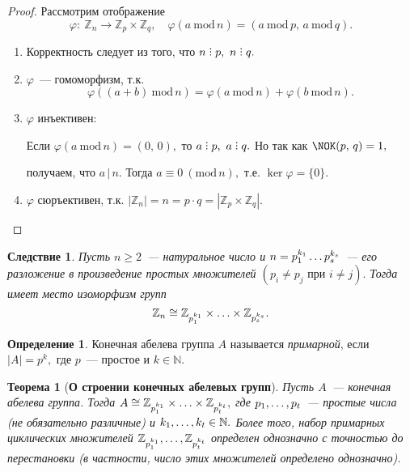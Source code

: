 \documentclass[a4paper, 14pt]{extarticle}
\newcommand{\n}{\par}
\newcommand{\integers}{\mathbb{Z}}
\newcommand{\naturals}{\mathbb{N}}
\DeclareRobustCommand{\divby}{%
	\mathrel{\text{\vbox{\baselineskip.65ex\lineskiplimit0pt\hbox{.}\hbox{.}\hbox{.}}}}%
}
\renewcommand{\phi}{\varphi}
\renewcommand{\mod}{\mathrm{mod} \,}
\theoremstyle{definition}
\newtheorem{definition}{Определение}
\theoremstyle{plain}
\newtheorem*{theorem*}{Теорема}
\numberwithin{theorem}{section}
\numberwithin{definition}{section}
\numberwithin{statement}{section}
\numberwithin{lemma}{section}
\newtheorem*{consequence*}{Следствие}
\numberwithin{consequence}{section}
\begin{document}
	\begin{proof}
		Рассмотрим отображение
		\begin{equation*}
			\phi{:} \ \integers_n \rightarrow \integers_p \times \integers_q, \quad \phi(a \ \mod n) = (a \ \mod p, \, a \ \mod q).
		\end{equation*}
		\begin{enumerate}
			\setlength\itemsep{0.1em}
			\item Корректность следует из того, что $n \divby p, \ n \divby q.$
			\item $\phi$~--- гомоморфизм, т.к.
			\begin{equation*}
				\phi((a + b) \ \mod n) = \phi(a \ \mod n) + \phi(b \ \mod n).
			\end{equation*}
			\item $\phi$ инъективен: \n
			Если ${\phi(a \ \mod n) =(0, \, 0),}$ то ${a \divby p, \ a \divby q.}$ Но так как ${\NOK(p, \, q) = 1,}$ \n
			получаем, что $a \, | \, n.$ Тогда ${a \equiv 0 \ (\mod n),}$ т.е. ${\ker \phi = \{0\}.}$
			\item $\phi$ сюръективен, т.к. ${|\integers_n| = n = p \cdot q = |\integers_p \times \integers_q|.}$ \qedhere
		\end{enumerate}
	\end{proof}
	\begin{consequence*}
		Пусть ${n \geqslant 2}$~--- натуральное число и ${n = p^{k_1}_1 \mathellipsis p^{k_s}_s}$~--- его разложение в произведение простых множителей ${(p_i \neq p_j \text{ при } i \neq j).}$ Тогда имеет место изоморфизм групп
		\begin{equation*}
			\integers_n \cong \integers_{p^{k_1}_1} \times \mathellipsis \times \integers_{p^{k_s}_s}.
		\end{equation*}
	\end{consequence*}
	\begin{definition}
		Конечная абелева группа $A$ называется \textit{примарной}, если ${|A| = p^k,}$ где $p$~--- простое и ${k \in \naturals.}$
	\end{definition}
	\begin{theorem*}[\textbf{О строении конечных абелевых групп}]
		Пусть $A$~--- конечная абелева группа. Тогда ${A \cong \integers_{p^{k_1}_1} \times \mathellipsis \times \integers_{p^{k_t}_t},}$ где ${p_1, \mathellipsis, p_t}$~--- простые числа (не обязательно различные) и ${k_1, \mathellipsis, k_t \in \naturals.}$ Более того, набор примарных циклических множителей ${\integers_{p^{k_1}_1}, \mathellipsis, \integers_{p^{k_t}_t}}$ определен однозначно с точностью до перестановки (в частности, число этих множителей определено однозначно).
	\end{theorem*}
	\newpage
\end{document}
